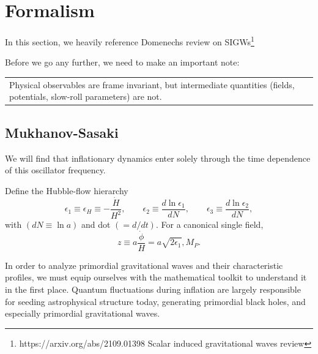 \section{Formalism}
 In this section, we heavily reference Domenechs review on SIGWs\footnote{https://arxiv.org/abs/2109.01398 Scalar induced gravitational waves review}

Before we go any further, we need to make an important note:
\begin{center}
    \begin{tabular}{|p{12cm}}
Physical observables are frame invariant, but intermediate quantities (fields, potentials, slow-roll parameters) are not.\\
\end{tabular}
\end{center}

\subsection{Mukhanov-Sasaki}




We will find that inflationary dynamics enter solely through the time dependence of this oscillator frequency.



Define the Hubble-flow hierarchy  
$$
\epsilon_1 \equiv \epsilon_H \equiv -\frac{\dot H}{H^2},\qquad  
\epsilon_2 \equiv \frac{d\ln \epsilon_1}{dN},\qquad  
\epsilon_3 \equiv \frac{d\ln \epsilon_2}{dN},  
$$
with $(dN\equiv \ln a)$ and dot $(=d/dt)$. For a canonical single field,  
$$
z \equiv a\frac{\dot\phi}{H} = a\sqrt{2\epsilon_1},M_P .  
$$




In order to analyze primordial gravitational waves and their characteristic profiles, we must equip ourselves with the mathematical toolkit to understand it in the first place. Quantum fluctuations during inflation are largely responsible for seeding astrophysical structure today, generating primordial black holes, and especially primordial gravitational waves. 



